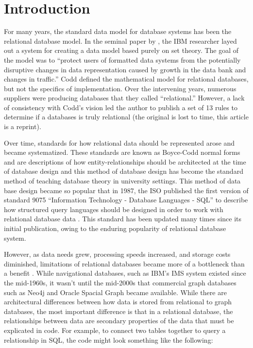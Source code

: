 \section{Introduction}

For many years, the standard data model for database systems has been the relational database model. In the seminal paper by \textcite{coddRelationalModelData1970}, the IBM researcher layed out a system for creating a data model based purely on set theory. The goal of the model was to ``protect users of formatted data systems from the potentially disruptive changes in data representation caused by growth in the data bank and changes in traffic.'' Codd defined the mathematical model for relational databases, but not the specifics of implementation. Over the intervening years, numerous suppliers were producing databases that they called ``relational.'' However, a lack of consistency with Codd's vision led the author to publish a set of 13 rules to determine if a databases is truly relational \parencite{coddYourDBMSReally1985} (the original is lost to time, this article is a reprint).

Over time, standards for how relational data should be represented arose and became systematized. These standards are known as Boyce-Codd normal forms and are descriptions of how entity-relationships should be architected at the time of database design \parencite{philipTeachingDatabaseModeling2007} and this method of database design has become the standard method of teaching database theory in university settings. This method of data base design became so popular that in 1987, the ISO published the first version of standard 9075 ``Information Technology - Database Languages - SQL'' to describe how structured query languages should be designed in order to work with relational database data \parencite{iso/iecjtc1ISO907519871987}. This standard has been updated many times since its initial publication, owing to the enduring popularity of relational database system.

However, as data needs grew, processing speeds increased, and storage costs diminished, limitations of relational databases became more of a bottleneck than a benefit \parencite{mohanHistoryRepeatsItself2013}.  While navigational databases, such as IBM's IMS system existed since the mid-1960s, it wasn't until the mid-2000s that commercial graph databases such as Neo4j and Oracle Spacial Graph became available. While there are architectural differences between how data is stored from relational to graph databases, the most important difference is that in a relational database, the relationships between data are secondary properties of the data that must be explicated in code. For example, to connect two tables together to query a relationship in SQL, the code might look something like the following:

